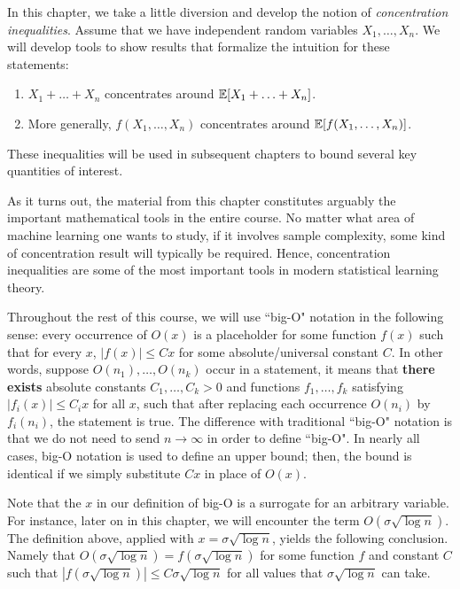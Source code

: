 \setcounter{section}{0}


In this chapter, we take a little diversion and develop the notion of \emph{concentration inequalities}. Assume that we have independent random variables $X_1, \ldots, X_n$. We will develop tools to show results that formalize the intuition for these statements:
\begin{enumerate}
    \item $X_1 + \ldots + X_n$ concentrates around $\operatorname*{\mathbb{E}}[X_1 + \ldots + X_n]$.
    \item More generally, $f(X_1, \ldots, X_n)$ concentrates around $\operatorname*{\mathbb{E}}[f(X_1, \ldots, X_n)]$.
\end{enumerate}
These inequalities will be used in subsequent chapters to bound several key quantities of interest.

As it turns out, the material from this chapter constitutes arguably the important mathematical tools in the entire course. No matter what area of machine learning one wants to study, if it involves sample complexity, some kind of concentration result will typically be required. Hence, concentration inequalities are some of the most important tools in modern statistical learning theory.


Throughout the rest of this course, we will use ``big-O" notation in the following sense: every occurrence of $O(x)$ is a placeholder for some function $f(x)$ such that for every $x$, $|f(x)| \leq Cx$ for some absolute/universal constant $C$. In other words, suppose $O(n_1),\dots, O(n_k)$ occur in a statement, it means that \textbf{there exists} absolute constants $C_1,\dots, C_k > 0$ and functions $f_1,\dots, f_k$ satisfying $|f_i(x)|\le C_ix$ for all $x$, such that after replacing each occurrence $O(n_i)$ by $f_i(n_i)$,  the statement is true.  The difference with traditional ``big-O" notation is that we do not need to send $n \to \infty$ in order to define ``big-O". In nearly all cases, big-O notation is used to define an upper bound; then, the bound is identical if we simply substitute $Cx$ in place of $O(x)$. 

Note that the $x$ in our definition of big-O is a surrogate for an arbitrary variable. For instance, later on in this chapter, we will encounter the term $O(\sigma \sqrt{\log n})$. The definition above, applied with $x = \sigma \sqrt{\log n}$, yields the following conclusion. Namely that $O(\sigma \sqrt{\log n}) = f(\sigma \sqrt{\log n})$ for some function $f$ and constant $C$ such that $|f(\sigma \sqrt{\log n})| \leq C \sigma  \sqrt{\log n}$ for all values that $\sigma \sqrt{\log n}$ can take. 

